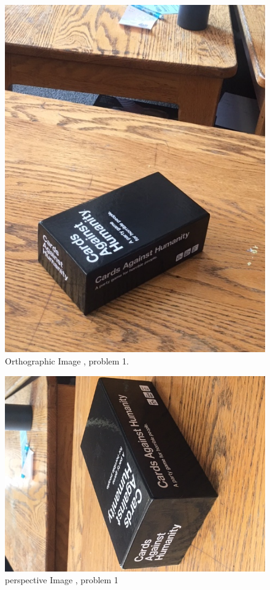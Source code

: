 \documentclass[a4paper,12pt]{article}
\begin{document}
\newline \begin{figure}
  \includegraphics[width=\linewidth]{orthographic.jpg}
  \caption{Orthographic Image , problem 1.}
  \label{fig:orthographic image}
\end{figure}
\begin{figure}
  \includegraphics[width=\linewidth ,angle =270 ]{perspective.jpg}
  \caption{perspective Image , problem 1}
  \label{fig:perspective image}
\end{figure}
\end{document}
